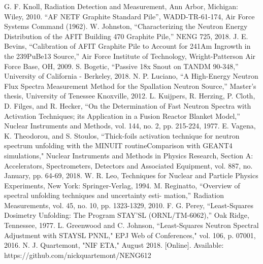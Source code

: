 \documentclass[journal]{IEEEtran}
\begin{document}
	\ifCLASSOPTIONcaptionsoff
	\newpage
	\fi
	
	\begin{thebibliography}{CLYC}
		G. F. Knoll, Radiation Detection and Measurement, Ann Arbor,
		Michigan: Wiley, 2010.
		“AF NETF Graphite Standard Pile”, WADD-TR-61-174, Air Force Systems Command (1962).
		W. Johnston, “Characterizing the Neutron Energy Distribution of the AFIT Building 470 Graphite Pile,” NENG 725, 2018.
		J. E. Bevins, “Calibration of AFIT Graphite Pile to Account for 241Am Ingrowth in the 239PuBe13 Source,” Air Force Institute of Technology, Wright-Patterson Air Force Base, OH, 2009. 
		S. Bogetic, “Passive 18x Snout on TANDM 90-348,” University of California - Berkeley, 2018.  
		N. P. Luciano, “A High-Energy Neutron Flux Spectra Measurement Method for
		the Spallation Neutron Source,” Master's thesis, University of Tenessee Knoxville,
		2012.
		L. Kuijpers, R. Herzing, P. Cloth, D. Filges, and R. Hecker, “On the Determination of Fast Neutron Spectra with Activation 
		Techniques; its Application in a Fusion Reactor Blanket Model,” Nuclear Instruments and Methods, vol. 144, no. 2, pp. 215-224, 1977. 
		E. Vagena, K. Theodorou, and S. Stoulos, “Thick-foils activation technique
		for neutron spectrum unfolding with the MINUIT routineComparison
		with GEANT4 simulations," Nuclear Instruments and Methods in Physics
		Research, Section A: Accelerators, Spectrometers, Detectors and Associated
		Equipment, vol. 887, no. January, pp. 64-69, 2018.
		W. R. Leo, Techniques for Nuclear and Particle Physics Experiments, New York: Springer-Verlag, 1994. 
		M. Reginatto, “Overview of spectral unfolding techniques and uncertainty esti-
		mation,” Radiation Measurements, vol. 45, no. 10, pp. 1323-1329, 2010.
		F. G. Perey, “Least-Squares Dosimetry Unfolding: The Program STAY'SL
		(ORNL/TM-6062),” Oak Ridge, Tennessee, 1977.
		L. Greenwood and C. Johnson, “Least-Squares Neutron Spectral Adjustment with
		STAYSL PNNL," EPJ Web of Conferences," vol. 106, p. 07001, 2016.
		N. J. Quartemont, "NIF ETA," August 2018. [Online]. Available:
		https://github.com/nickquartemont/NENG612
	\end{thebibliography}
	
\end{document}
